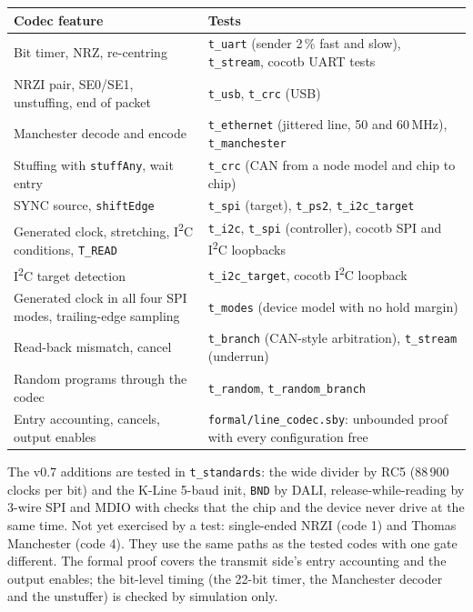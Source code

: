 \documentclass[11pt,a4paper]{article}
\newcommand{\sig}[1]{\texttt{#1}}
\begin{document}
\begin{center}
\begin{tabularx}{\linewidth}{@{}l L@{}}
\toprule
Codec feature & Tests \\
\midrule
Bit timer, NRZ, re-centring & \sig{t\_uart} (sender 2\,\% fast and slow), \sig{t\_stream}, cocotb UART tests \\
NRZI pair, SE0/SE1, unstuffing, end of packet & \sig{t\_usb}, \sig{t\_crc} (USB) \\
Manchester decode and encode & \sig{t\_ethernet} (jittered line, 50 and 60\,MHz), \sig{t\_manchester} \\
Stuffing with \sig{stuffAny}, wait entry & \sig{t\_crc} (CAN from a node model and chip to chip) \\
SYNC source, \sig{shiftEdge} & \sig{t\_spi} (target), \sig{t\_ps2}, \sig{t\_i2c\_target} \\
Generated clock, stretching, I\textsuperscript{2}C conditions, \sig{T\_READ} & \sig{t\_i2c}, \sig{t\_spi} (controller), cocotb SPI and I\textsuperscript{2}C loopbacks \\
I\textsuperscript{2}C target detection & \sig{t\_i2c\_target}, cocotb I\textsuperscript{2}C loopback \\
Generated clock in all four SPI modes, trailing-edge sampling & \sig{t\_modes} (device model with no hold margin) \\
Read-back mismatch, cancel & \sig{t\_branch} (CAN-style arbitration), \sig{t\_stream} (underrun) \\
Random programs through the codec & \sig{t\_random}, \sig{t\_random\_branch} \\
Entry accounting, cancels, output enables & \sig{formal/line\_codec.sby}: unbounded proof with every configuration free \\
\bottomrule
\end{tabularx}
\end{center}

The v0.7 additions are tested in \sig{t\_standards}: the wide divider by RC5 (88\,900 clocks per bit) and the K-Line 5-baud init, \sig{BND} by DALI, release-while-reading by 3-wire SPI and MDIO with checks that the chip and the device never drive at the same time. Not yet exercised by a test: single-ended NRZI (code 1) and Thomas Manchester (code 4). They use the same paths as the tested codes with one gate different. The formal proof covers the transmit side's entry accounting and the output enables; the bit-level timing (the 22-bit timer, the Manchester decoder and the unstuffer) is checked by simulation only.
\end{document}
